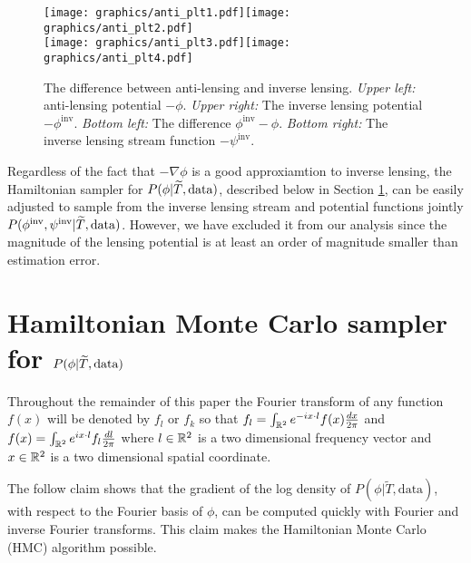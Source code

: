 \documentclass[noinfoline]{imsart}
\begin{document}
\begin{figure}[t]
\label{antilensing plots}
\texttt{[image: graphics/anti\_plt1.pdf]}\texttt{[image: graphics/anti\_plt2.pdf]}\\%
\texttt{[image: graphics/anti\_plt3.pdf]}\texttt{[image: graphics/anti\_plt4.pdf]}
\caption{The difference between anti-lensing and inverse lensing. {\em Upper left:} anti-lensing potential $-\phi$. {\em Upper right:} The inverse lensing potential $-\phi^\text{inv}$. {\em Bottom left:} The difference $\phi^\text{inv}-\phi$. {\em Bottom right:} The inverse lensing stream function $-\psi^\text{inv}$.}
\end{figure}


Regardless of the fact that $-\nabla\phi$ is a good approxiamtion to inverse lensing, the Hamiltonian sampler for $P(\phi | \widetilde T,  \text{\rm data})$, described below in Section \ref{Section: hamiltonian sampler section},  can be easily adjusted to sample from the inverse lensing stream and potential functions jointly $P(\phi^\text{inv},\psi^\text{inv} | \widetilde T,  \text{\rm data})$.   However, we have excluded it from our analysis since the magnitude of the lensing potential is at least an order of magnitude smaller than estimation error. 










%
%
\section{Hamiltonian Monte Carlo sampler for $P(\phi | \widetilde T,  \text{\rm data})$}
\label{Section: hamiltonian sampler section}


Throughout the remainder of this paper the Fourier transform of any function $f(x)$ will be denoted by $f_l$ or $f_k$ so that
$f_l  =  \int_{\Bbb R^2} e^{-i x\cdot l}  f(x)\frac{dx}{2\pi}$ and
$f(x) =  \int_{\Bbb R^2} e^{i x\cdot l}  f_l \frac{dl}{2\pi}$ 
where $l\in \Bbb R^2$ is a two dimensional frequency vector and $x\in \Bbb R^2$  is a two dimensional spatial coordinate.


The follow claim shows that the gradient of the log density of $P(\phi|\widetilde T, \text{data})$, with respect to the Fourier basis of $\phi$, can be computed quickly with Fourier and inverse Fourier transforms. This claim makes the Hamiltonian Monte Carlo (HMC) algorithm possible.
\end{document}
